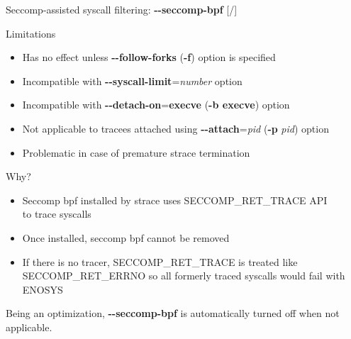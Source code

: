\documentclass[unicode,aspectratio=169,xcolor={table,dvipsnames,usernames}]{beamer}
\begin{document}
\begin{frame}{Seccomp-assisted syscall filtering: \textbf{-{}-seccomp-bpf} \hfill [\insertframenumber/\inserttotalframenumber]}
\begin{block}{Limitations}
\begin{itemize}
	\item Has no effect unless \textbf{-{}-follow-forks} (\textbf{-f}) option is specified
	\item Incompatible with \textbf{-{}-syscall-limit}=\textit{number} option
	\item Incompatible with \textbf{-{}-detach-on}=\textbf{execve} (\textbf{-b execve}) option
	\item Not applicable to tracees attached using \textbf{-{}-attach}=\textit{pid} (\textbf{-p} \textit{pid}) option
	\item Problematic in case of premature strace termination
\end{itemize}
\end{block}

\begin{block}{Why?}
\begin{itemize}
	\item Seccomp bpf installed by strace uses SECCOMP\_RET\_TRACE API \\ to trace syscalls
	\item Once installed, seccomp bpf cannot be removed
	\item If there is no tracer, SECCOMP\_RET\_TRACE is treated like SECCOMP\_RET\_ERRNO
		so all formerly traced syscalls would fail with ENOSYS
\end{itemize}
\end{block}

Being an optimization, \textbf{-{}-seccomp-bpf} is automatically turned off when not applicable.
\end{frame}
\end{document}
